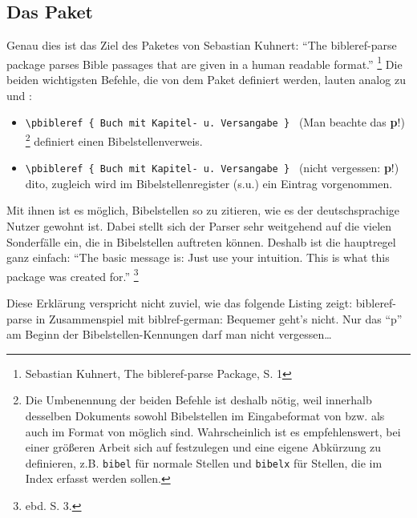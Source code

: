 \subsection{Das Paket }

Genau dies ist das Ziel des Paketes  von Sebastian Kuhnert:
\enquote{The bibleref-parse package parses Bible passages that are given in a human readable format.}
\footnote{Sebastian Kuhnert, The bibleref-parse Package, S. 1}
Die beiden wichtigsten Befehle, die von dem Paket definiert werden, lauten analog zu
 und :

\begin{itemize}
    \item\lstinline/\pbibleref { Buch mit Kapitel- u. Versangabe } / (Man beachte das \textbf{p}!) 
    \footnote{Die Umbenennung der beiden Befehle ist deshalb nötig, weil innerhalb desselben 
        Dokuments sowohl Bibelstellen im Eingabeformat von  bzw.  als auch 
        im Format von  möglich sind. Wahrscheinlich ist es empfehlenswert, bei einer größeren
        Arbeit sich auf  festzulegen und eine eigene Abkürzung zu definieren, z.B. 
        \lstinline/bibel/ für normale Stellen und \lstinline/bibelx/ für Stellen, die im Index
        erfasst werden sollen.}
    definiert einen Bibelstellenverweis.
    \item\lstinline/\pbibleref { Buch mit Kapitel- u. Versangabe } / (nicht vergessen: \textbf{p}!) dito, zugleich wird im Bibelstellenregister (s.u.)
    ein Eintrag vorgenommen.
\end{itemize}

Mit ihnen ist es möglich, Bibelstellen so zu zitieren, wie es der deutschsprachige Nutzer gewohnt ist.
Dabei stellt sich der Parser sehr weitgehend auf die vielen Sonderfälle ein, die in Bibelstellen 
auftreten können. Deshalb ist die hauptregel ganz einfach:
\enquote{The  basic message is: Just use your intuition. This is what this package was created for.}%
\footnote{ebd. S. 3.}

Diese Erklärung verspricht nicht zuviel, wie das folgende Listing zeigt:
bibleref-parse in Zusammenspiel mit biblref-german:
Bequemer geht's nicht. Nur das \enquote{p} am Beginn der Bibelstellen-Kennungen darf man nicht vergessen\ldots

%

